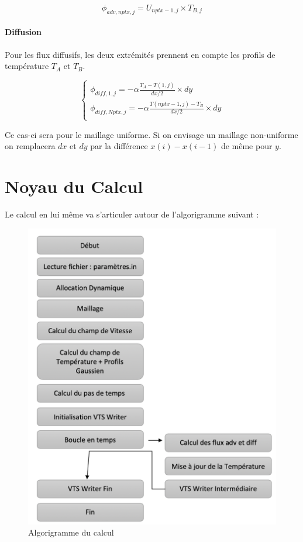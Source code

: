 \documentclass[a4paper,oneside]{article}
\makeatletter
\def\bigcenter{\trivlist \bigcentering\item\relax}
\def\bigcentering{\let\\\@centercr\rightskip\@bigflushglue%
\leftskip\@bigflushglue
\parindent\z@\parfillskip\z@skip}
\makeatother
\begin{document}
\[
 \phi_{adv,nptx,j} =U_{nptx-1,j}\times T_{B,j}
\]  


\paragraph{Diffusion}


Pour les flux diffusifs, les deux extrémités prennent en compte les profils de température $T_A$ et $T_B$.

\begin{equation*}
	\begin{cases}
		\phi_{diff,1,j} = -\alpha\frac{T_A - T(1,j)}{dx/2} \times dy\\
		\phi_{diff,Nptx,j} = -\alpha\frac{T(nptx-1,j) -T_B }{dx/2} \times dy\\
	\end{cases}
\end{equation*}
 
Ce cas-ci sera pour le maillage uniforme.
Si on envisage un maillage non-uniforme on remplacera $dx$ et $dy$ par la différence $x(i)-x(i-1)$ de même pour $y$.

\section{Noyau du Calcul}

Le calcul en lui même va s'articuler autour de l'algorigramme suivant :

\begin{figure}[h!]
\bigcenter
\includegraphics[scale=0.4]{Algo.PNG}
\caption{Algorigramme du calcul}
\end{figure}
\end{document}
